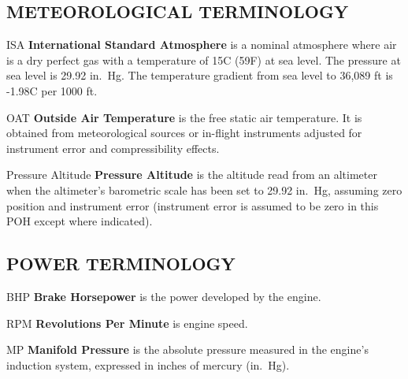 \subsection{METEOROLOGICAL TERMINOLOGY} 
\begin{Description}
	\item[ISA] \textbf{International Standard Atmosphere} is a nominal atmosphere where air is a dry perfect gas with a temperature of 15\textdegree C (59\textdegree F) at sea level. The pressure at sea level is 29.92 in.\ Hg. The temperature gradient from sea level to 36,089 ft is -1.98\textdegree C per 1000 ft. 
	\item[OAT] \textbf{Outside Air Temperature} is the free static air temperature. It is obtained from meteorological sources or in-flight instruments adjusted for instrument error and compressibility effects. 
	\item[Pressure Altitude] \textbf{Pressure Altitude} is the altitude read from an altimeter when the altimeter's barometric scale has been set to 29.92 in.\ Hg, assuming zero position and instrument error (instrument error is assumed to be zero in this POH except where indicated). 
\end{Description}

\subsection{POWER TERMINOLOGY} 
\begin{Description}
	\item[BHP]\textbf{Brake Horsepower} is the power developed by the engine. 
	\item[RPM]\textbf{Revolutions Per Minute} is engine speed. 
	\item[MP]\textbf{Manifold Pressure} is the absolute pressure measured in the engine's induction system, expressed in inches of mercury (in.\ Hg).
	
\end{Description}

